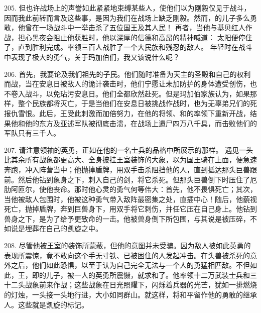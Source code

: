 205. 但也许战场上的声誉如此紧紧地束缚某些人，使他们以为刚毅仅见于战斗，因而我此前转而言及这些事，是因为我们在战场上缺乏刚毅。然而，的儿子多么勇敢，他曾在一场战斗中一举击杀了五位国王及其人民！ 再者，当他与基贝红人作战，担心黑夜会阻止他获胜时，他以深厚的信德和高昂的精神喊道： 太阳便停住了，直到胜利完成。率领三百人战胜了一个大民族和残忍的敌人。 年轻时在战斗中表现了极大的勇气，关于玛加伯们，我又该说什么呢？\par

206. 首先，我要论及我们祖先的子民。他们随时准备为天主的圣殿和自己的权利而战，当在安息日被敌人的诡计袭击时，他们宁愿让未加防护的身体遭受创伤，也不卷入战斗，以免玷污安息日。他们全都欣然赴死。但是玛加伯家族认为，如果那样，整个民族都将灭亡，于是当他们在安息日被挑战作战时，也为无辜弟兄们的死报仇雪恨。此后，王受此刺激而加倍努力，在他的将领、和的率领下重新开战，结果他和他的东方及亚述军队被彻底击溃，在战场上遗尸四万八千具，而击败他们的军队只有三千人。\par

207. 请注意领袖的英勇，正如在他的一名士兵的品格中所展示的那样。 遇见一头比其余所有战象都更高大、全身披挂王室装饰的大象，以为国王骑在上面，便急速奔跑，冲入阵营当中；他抛掉盾牌，用双手击杀阻挡他的人，直到抵达那头巨兽跟前。然后他钻到象身之下，刺入自己的剑，将它杀死。但那头巨兽倒下时压住了厄肋阿匝尔，使他丧命。那时他心灵的勇气何等伟大：首先，他不畏惧死亡；其次，当他被敌人包围时，他被这种勇气带入敌阵最密集之处，直插中心！随后，他藐视死亡，抛掉盾牌，奔到巨兽身下，用双手将它刺伤，并任它压在自己身上。他钻到兽身之下，是为了给予更致命的一击。他被兽身倒下所包围，与其说是被压碎，不如说是埋葬在自己的凯旋之中。\par

208. 尽管他被王室的装饰所蒙蔽，但他的意图并未受骗。因为敌人被如此英勇的表现所震惊，竟不敢向这个手无寸铁、已被困住的人发起冲击。在头兽被杀死的意外之后，他们如此恐惧，以至于认为自己完全无法与一个人的勇猛相匹敌。不但如此，王，即的儿子，被一人的英勇所震慑，就求和了。他率领十二万武装士兵和三十二头战象前来作战；这些战象在日光照耀下，闪烁着兵器的光芒，犹如一排燃烧的灯烛，一头接一头地行进，大小如同群山。就这样，将和平留作他的勇敢的继承人。这些就是凯旋的标记。\par

